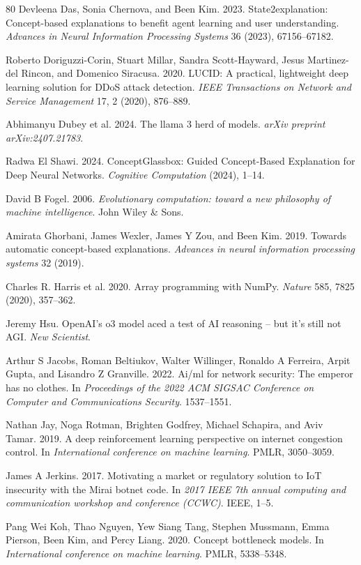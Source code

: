 \documentclass[11pt,a4paper]{article}
\begin{document}
\begin{thebibliography}{80}
 Devleena Das, Sonia Chernova, and Been Kim. 2023. State2explanation: Concept-based explanations to benefit agent learning and user understanding. \emph{Advances in Neural Information Processing Systems} 36 (2023), 67156--67182.

 Roberto Doriguzzi-Corin, Stuart Millar, Sandra Scott-Hayward, Jesus Martinez-del Rincon, and Domenico Siracusa. 2020. LUCID: A practical, lightweight deep learning solution for DDoS attack detection. \emph{IEEE Transactions on Network and Service Management} 17, 2 (2020), 876--889.

 Abhimanyu Dubey et al. 2024. The llama 3 herd of models. \emph{arXiv preprint arXiv:2407.21783}.

 Radwa El Shawi. 2024. ConceptGlassbox: Guided Concept-Based Explanation for Deep Neural Networks. \emph{Cognitive Computation} (2024), 1--14.

 David B Fogel. 2006. \emph{Evolutionary computation: toward a new philosophy of machine intelligence}. John Wiley \& Sons.

 Amirata Ghorbani, James Wexler, James Y Zou, and Been Kim. 2019. Towards automatic concept-based explanations. \emph{Advances in neural information processing systems} 32 (2019).

 Charles R. Harris et al. 2020. Array programming with NumPy. \emph{Nature} 585, 7825 (2020), 357--362.

 Jeremy Hsu. OpenAI's o3 model aced a test of AI reasoning -- but it's still not AGI. \emph{New Scientist}.

 Arthur S Jacobs, Roman Beltiukov, Walter Willinger, Ronaldo A Ferreira, Arpit Gupta, and Lisandro Z Granville. 2022. Ai/ml for network security: The emperor has no clothes. In \emph{Proceedings of the 2022 ACM SIGSAC Conference on Computer and Communications Security}. 1537--1551.

 Nathan Jay, Noga Rotman, Brighten Godfrey, Michael Schapira, and Aviv Tamar. 2019. A deep reinforcement learning perspective on internet congestion control. In \emph{International conference on machine learning}. PMLR, 3050--3059.

 James A Jerkins. 2017. Motivating a market or regulatory solution to IoT insecurity with the Mirai botnet code. In \emph{2017 IEEE 7th annual computing and communication workshop and conference (CCWC)}. IEEE, 1--5.

 Pang Wei Koh, Thao Nguyen, Yew Siang Tang, Stephen Mussmann, Emma Pierson, Been Kim, and Percy Liang. 2020. Concept bottleneck models. In \emph{International conference on machine learning}. PMLR, 5338--5348.


\end{thebibliography}
\end{document}
